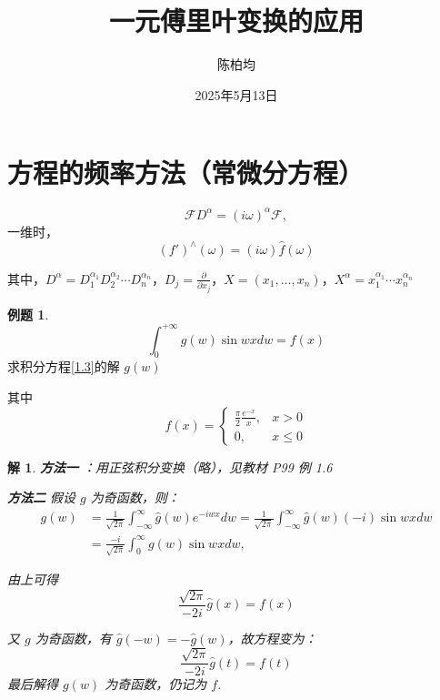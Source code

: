 \documentclass[12pt,a4paper]{article}
\title{一元傅里叶变换的应用}
\author{陈柏均}
\date{2025年5月13日}
\numberwithin{subsection}{section}   %
\numberwithin{subsubsection}{subsection}
\theoremstyle{plain}
\newtheorem{solution}{解}[section]  %
\theoremstyle{definition}
\newtheorem{example}{例题}[section]  %
\theoremstyle{remark}
\theoremstyle{remark}
\begin{document}
	\maketitle


\section{方程的频率方法（常微分方程）}
\begin{equation}
	\mathcal{F} D^\alpha = (i \omega)^\alpha \mathcal{F}, 
\end{equation}
	一维时，
\begin{equation}
 (f')^\wedge(\omega) = (i \omega) \hat{f}(\omega) 
\end{equation}

其中，\(D^\alpha = D_1^{\alpha_1} D_2^{\alpha_2} \cdots D_n^{\alpha_n}\)，\(D_j = \frac{\partial}{\partial x_j}\)，\(X = (x_1, \ldots, x_n)\)，\(X^\alpha = x_1^{\alpha_1} \cdots x_n^{\alpha_n}\)

\begin{example}
	
		\begin{equation}\label{1.3}
	\int_0^{+\infty} g(w) \sin w x dw = f(x)
		\end{equation}
	求积分方程\eqref{1.3}的解 \(g(w)\)
	
	其中
	\begin{equation}
		f(x) = 
		\begin{cases} 
			\frac{\pi}{2} \frac{e^{-x}}{x}, & x > 0 \\[8pt]
						0, & x \leq 0
		\end{cases}
	\end{equation}
\end{example}

\begin{solution}
\textbf{方法一}	：用正弦积分变换（略），见教材 P99 例 1.6

\textbf{方法二}
		假设 \(g\) 为奇函数，则：
	\begin{equation}
		\begin{aligned}
			g(w) &= \frac{1}{\sqrt{2 \pi}} \int_{-\infty}^{\infty} \hat{g}(w) e^{-i w x} dw = \frac{1}{\sqrt{2 \pi}} \int_{-\infty}^{\infty} \hat{g}(w) (-i) \sin w x dw \\[8pt]
			&= \frac{-i}{\sqrt{2 \pi}} \int_0^{\infty} g(w) \sin w x dw,
		\end{aligned}
	\end{equation}
		
		由上可得
		\begin{equation}
 \frac{\sqrt{2 \pi}}{-2 i} \hat{g}(x) = f(x)
\end{equation}

 又 \(g\) 为奇函数，有 \(\hat{g}(-w) = -\hat{g}(w)\)，故方程变为：
	\begin{equation}\label{1.6}
		\frac{\sqrt{2 \pi}}{-2 i} \hat{g}(t) = f(t)
	\end{equation}
	最后解得 \(g(w)\) 为奇函数，仍记为 \(f\).
\end{solution}
\end{document}

